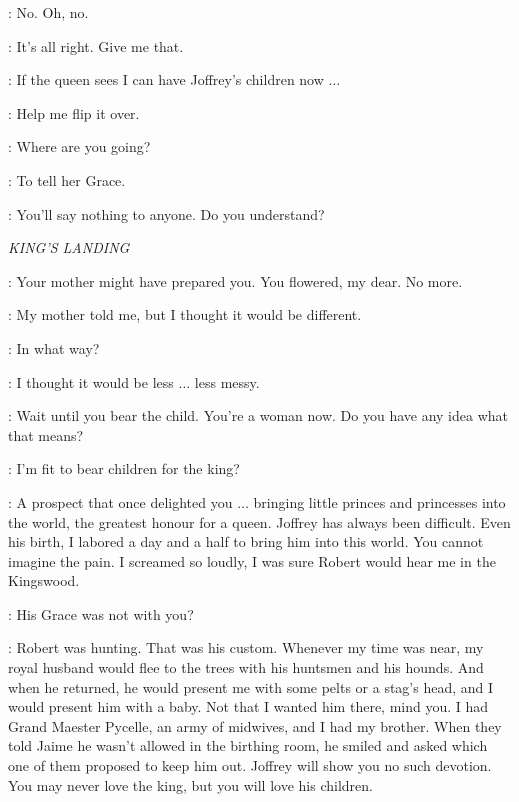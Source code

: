 \SANSA: No. Oh, no.


\SHAE: It's all right. Give me that.


\SANSA: If the queen sees I can have Joffrey's children now $\ldots$

\SHAE: Help me flip it over.



\SHAE: Where are you going?

\HANDMAID: To tell her Grace.


\SHAE: You'll say nothing to anyone. Do you understand?



\scene

\textit{KING'S LANDING}


\CERSEI: Your mother might have prepared you. You flowered, my dear. No more.

\SANSA: My mother told me, but I thought it would be different.

\CERSEI: In what way?

\SANSA: I thought it would be less $\ldots$ less messy.

\CERSEI: Wait until you bear the child. You're a woman now. Do you have any idea what that means?

\SANSA: I'm fit to bear children for the king?

\CERSEI: A prospect that once delighted you $\ldots$ bringing little princes and princesses into the world, the greatest honour for a queen. Joffrey has always been difficult. Even his birth, I labored a day and a half to bring him into this world. You cannot imagine the pain. I screamed so loudly, I was sure Robert would hear me in the Kingswood.

\SANSA: His Grace was not with you?

\CERSEI: Robert was hunting. That was his custom. Whenever my time was near, my royal husband would flee to the trees with his huntsmen and his hounds. And when he returned, he would present me with some pelts or a stag's head, and I would present him with a baby. Not that I wanted him there, mind you. I had Grand Maester Pycelle, an army of midwives, and I had my brother. When they told Jaime he wasn't allowed in the birthing room, he smiled and asked which one of them proposed to keep him out. Joffrey will show you no such devotion. You may never love the king, but you will love his children.


